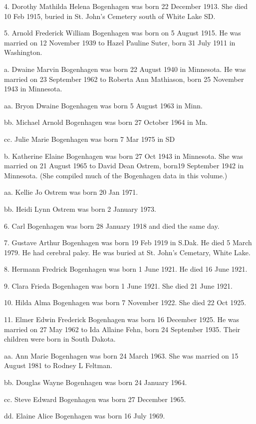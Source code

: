 \documentclass[a4paper]{article}
\begin{document}
4. Dorothy Mathilda Helena Bogenhagen was born 22 December 1913.  She died 10 Feb 1915, buried in St. John's Cemetery south of White Lake SD.

5. Arnold Frederick William Bogenhagen was born on 5 August 1915.  He was married on 12 November 1939 to Hazel Pauline Suter, born 31 July 1911 in Washington. 
		
a. Dwaine Marvin Bogenhagen was born 22 August 1940 in Minnesota. He was married on 23 September 1962 to Roberta Ann Mathiason, born 25 November 1943 in Minnesota. 

aa. Bryon Dwaine Bogenhagen was born 5 August 1963 in Minn.

bb. Michael Arnold Bogenhagen was born 27 October 1964 in Mn.

cc. Julie Marie Bogenhagen was born 7 Mar 1975 in SD

b. Katherine Elaine Bogenhagen was born 27 Oct 1943 in Minnesota. She was married on 21 August 1965 to David Dean Ostrem, born19 September 1942 in Minnesota.  (She compiled much of the Bogenhagen data in this volume.)

aa. Kellie Jo Ostrem was born 20 Jan 1971.

bb. Heidi Lynn Ostrem was born 2 January 1973.

6. Carl Bogenhagen was born 28 January 1918 and died the same day.

7. Gustave Arthur Bogenhagen was born 19 Feb 1919 in S.Dak.  He died 5 March 1979.  He had cerebral palsy.  He was buried at St. John's Cemetary, White Lake.

8. Hermann Fredrick Bogenhagen was born 1 June 1921.  He died 16 June 1921.

9. Clara Frieda Bogenhagen was born 1 June 1921. She died 21 June 1921.

10. Hilda Alma Bogenhagen was born 7 November 1922.  She died 22 Oct 1925.

11. Elmer Edwin Frederick Bogenhagen was born 16 December 1925.  He was married on 27 May 1962 to Ida Allaine Fehn, born 24 September 1935.  Their children were born in South Dakota.

aa. Ann Marie Bogenhagen was born 24 March 1963.  She was married on 15 August 1981 to Rodney L Feltman.

bb. Douglas Wayne Bogenhagen was born 24 January 1964.

cc. Steve Edward Bogenhagen was born 27 December 1965.

dd. Elaine Alice Bogenhagen was born 16 July 1969.
\end{document}
